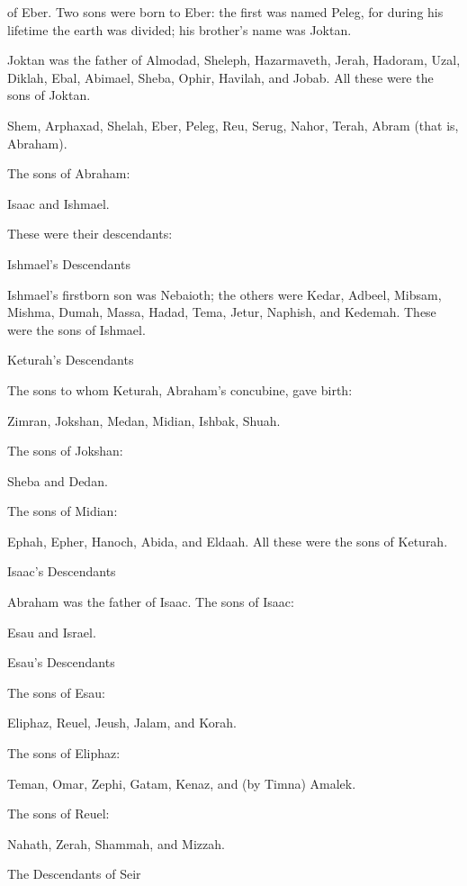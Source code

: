 {of Eber.
Two
sons
were born
to Eber: the first
was named
Peleg,
for
during his lifetime
the earth
was divided;
his brother’s
name
was Joktan.
\par }{\PP {}Joktan
was the father
of Almodad,
Sheleph,
Hazarmaveth,
Jerah,
Hadoram,
Uzal,
Diklah,
Ebal,
Abimael,
Sheba,
Ophir,
Havilah,
and Jobab.
All
these
were the sons
of Joktan.
\par }{\PP {}Shem,
Arphaxad,
Shelah,
Eber,
Peleg,
Reu,
Serug,
Nahor,
Terah,
Abram
(that
is, Abraham).
\par }{\PP {}The sons
of Abraham:
\par }{\PP Isaac
and Ishmael.
\par }{\PP {}These
were their descendants:
\par }{\SH Ishmael’s Descendants
\par }{\PP Ishmael’s firstborn son was Nebaioth; the others were Kedar, Adbeel, Mibsam,
Mishma,
Dumah,
Massa,
Hadad,
Tema,
Jetur,
Naphish,
and Kedemah.
These
were
the sons
of Ishmael.
\par }{\SH Keturah’s Descendants
\par }{\PP {}The sons
to whom Keturah,
Abraham’s
concubine,
gave birth:
\par }{\PP Zimran,
Jokshan,
Medan,
Midian,
Ishbak,
Shuah.
\par }{\PP The sons
of Jokshan:
\par }{\PP Sheba
and Dedan.
\par }{\PP {}The sons
of Midian:
\par }{\PP Ephah,
Epher,
Hanoch,
Abida,
and Eldaah.
All
these
were the sons
of Keturah.
\par }{\SH Isaac’s Descendants
\par }{\PP {}Abraham
was the father
of Isaac.
The sons
of Isaac:
\par }{\PP Esau
and Israel.
\par }{\SH Esau’s Descendants
\par }{\PP {}The sons
of Esau:
\par }{\PP Eliphaz,
Reuel,
Jeush,
Jalam,
and Korah.
\par }{\PP {}The sons
of Eliphaz:
\par }{\PP Teman,
Omar,
Zephi,
Gatam,
Kenaz,
and (by Timna) Amalek.
\par }{\PP {}The sons
of Reuel:
\par }{\PP Nahath,
Zerah,
Shammah,
and Mizzah.
\par }{\SH The Descendants of Seir
}

